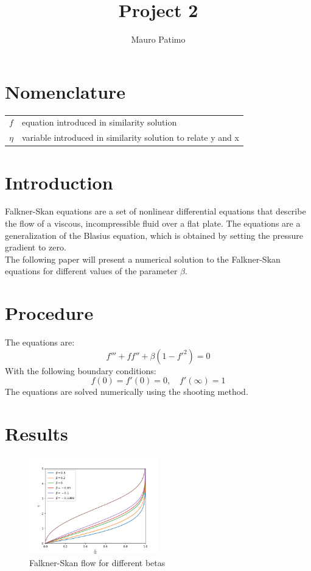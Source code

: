 \documentclass[conf]{new-aiaa}
\title{Project 2}
\author{Mauro Patimo}
\begin{document}
\maketitle

\section{Nomenclature}

{\renewcommand\arraystretch{1.0}
\noindent\begin{longtable*}{@{}l @{\quad=\quad} l@{}}
$f$  & equation introduced in similarity solution \\
$\eta$ & variable introduced in similarity solution to relate y and x\\

\end{longtable*}}

\section{Introduction}
Falkner-Skan equations are a set of nonlinear differential equations that describe the flow of a viscous, incompressible fluid over a flat plate. The equations are a generalization of the Blasius equation, which is obtained by setting the pressure gradient to zero. \\
The following paper will present a numerical solution to the Falkner-Skan equations for different values of the parameter $\beta$. \\
\section{Procedure}
The equations are:
\begin{equation}
    f'''+ff''+\beta(1-f'^2)=0
\end{equation}
With the following boundary conditions:
\begin{equation}
    f(0)=f'(0)=0, \quad f'(\infty)=1
\end{equation}
The equations are solved numerically using the shooting method.
\section{Results}
\begin{figure}[H]
    \centering
    \includegraphics[width=0.5\textwidth]{Project 2.png}
    \caption{Falkner-Skan flow for different betas}
    \label{fig:Falkner-Skan for different betas}
\end{figure}
\end{document}
